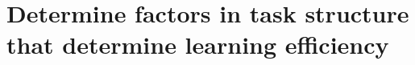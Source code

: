 

\section{Determine factors in task structure that determine learning efficiency}
\label{sec:proposal_rq1}


